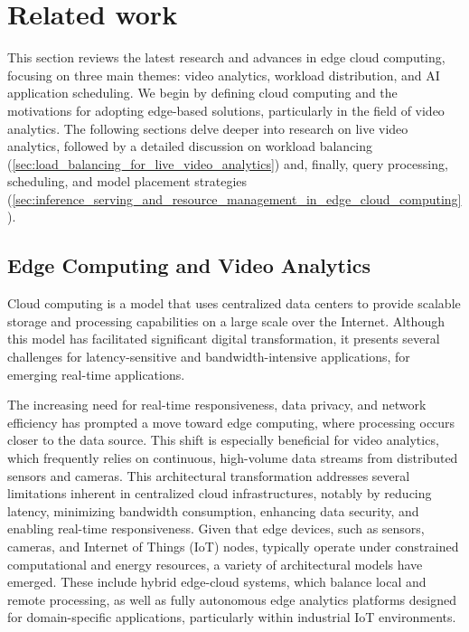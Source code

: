 \setchapterpreamble[u]{\margintoc}
\chapter{Related work}

This section reviews the latest research and advances in edge cloud computing, focusing on three main themes: video analytics, workload distribution, and AI application scheduling. We begin by defining cloud computing and the motivations for adopting edge-based solutions, particularly in the field of video analytics. The following sections delve deeper into research on live video analytics, followed by a detailed discussion on workload balancing (\cref{sec:load_balancing_for_live_video_analytics}) and, finally, query processing, scheduling, and model placement strategies (\cref{sec:inference_serving_and_resource_management_in_edge_cloud_computing}).



% 


\section{Edge Computing and Video Analytics}

Cloud computing is a model that uses centralized data centers to provide scalable storage and processing capabilities on a large scale over the Internet. Although this model has facilitated significant digital transformation, it presents several challenges for latency-sensitive and bandwidth-intensive applications, for emerging real-time applications.

The increasing need for real-time responsiveness, data privacy, and network efficiency has prompted a move toward edge computing, where processing occurs closer to the data source. This shift is especially beneficial for video analytics, which frequently relies on continuous, high-volume data streams from distributed sensors and cameras. This architectural transformation addresses several limitations inherent in centralized cloud infrastructures, notably by reducing latency, minimizing bandwidth consumption, enhancing data security, and enabling real-time responsiveness. Given that edge devices, such as sensors, cameras, and Internet of Things (IoT) nodes, typically operate under constrained computational and energy resources, a variety of architectural models have emerged. These include hybrid edge-cloud systems, which balance local and remote processing, as well as fully autonomous edge analytics platforms designed for domain-specific applications, particularly within industrial IoT environments.

